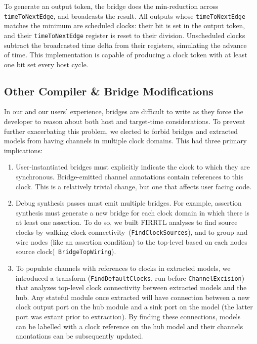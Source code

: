 To generate an output token, the bridge does the min-reduction across
\texttt{timeToNextEdge}, and broadcasts the result. All outputs whose
\texttt{timeToNextEdge} matches the minimum are scheduled clocks: their bit is
set in the output token, and their \texttt{timeToNextEdge} register is reset to
their division. Unscheduled clocks subtract the broadcasted time delta from
their registers, simulating the advance of time.  This implementation is
capable of producing a clock token with at least one bit set every host cycle.

\subsection{Other Compiler \& Bridge Modifications}

In our and our users' experience, bridges are difficult to write as they force
the developer to reason about both host and target-time considerations. To
prevent further exacerbating this problem, we elected to forbid bridges and
extracted models from having channels in multiple clock domains. This had three
primary implications:

\begin{enumerate}
\item User-instantiated bridges must explicitly indicate the clock to which
they are synchronous. Bridge-emitted channel annotations contain references to
this clock. This is a relatively trivial change, but one that affects user
facing code.

\item Debug synthesis passes must emit multiple bridges. For example, assertion
synthesis must generate a new bridge for each clock domain in which there is at
least one assertion. To do so, we built FIRRTL analyses to find source clocks
        by walking clock connectivity~(\texttt{FindClockSources}), and to group and wire
nodes (like an assertion condition) to the top-level based on each nodes source
clock(~\texttt{BridgeTopWiring}).

\item To populate channels with references to clocks in extracted models, we
introduced a transform (\texttt{FindDefaultClocks}, run before \texttt{ChannelExcision}) that analyzes top-level
clock connectivity between extracted models and the hub. Any stateful module
once extracted will have connection between a new clock output port on the hub
module and a sink port on the model (the latter port was extant prior to extraction). By
finding these connections, models can be labelled with a clock reference on the
hub model and their channels anontations can be subsequently updated.
\end{enumerate}

